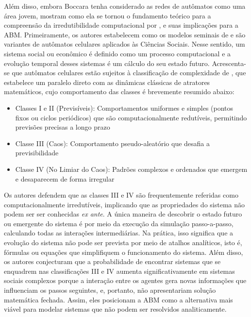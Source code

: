 \documentclass[12pt,oneside,a4paper,brazil,sumario=tradicional]{abntex2}
\begin{document}
Além disso, embora Boccara tenha considerado as redes de autômatos como uma área jovem,  mostram como ela se tornou o fundamento teórico para a compreensão da irredutibilidade computacional por , e suas implicações para a ABM. Primeiramente, os autores estabelecem como os modelos seminais de  e  são variantes de autômatos celulares aplicados às Ciências Sociais. Nesse sentido, um sistema social ou econômico é definido como um processo computacional e a evolução temporal desses sistemas é um cálculo do seu estado futuro. Acrescenta-se que autômatos celulares estão sujeitos à classificação de complexidade de , que estabelece um paralelo direto com as dinâmicas clássicas de atratores matemáticos, cujo comportamento das classes é brevemente resumido abaixo:

\begin{itemize}
  \item Classes I e II (Previsíveis): Comportamentos uniformes e simples (pontos fixos ou ciclos periódicos) que são computacionalmente redutíveis, permitindo previsões precisas a longo prazo
  \item Classe III (Caos): Comportamento pseudo-aleatório que desafia a previsibilidade
  \item Classe IV (No Limiar do Caos): Padrões complexos e ordenados que emergem e desaparecem de forma irregular
\end{itemize}
Os autores defendem que as classes III e IV são frequentemente referidas como computacionalmente irredutíveis, implicando que as propriedades do sistema não podem ser ser conhecidas \textit{ex ante}. A única maneira de descobrir o estado futuro ou emergente do sistema é por meio da execução da simulação passo-a-passo, calculando todas as interações intermediárias. Na prática, isso significa que a evolução do sistema não pode ser prevista por meio de atalhos analíticos, isto é, fórmulas ou equações que simplifiquem o funcionamento do sistema. Além disso, os autores conjecturam que a probabilidade de encontrar sistemas que se enquadrem nas classificações III e IV aumenta significativamente em sistemas sociais complexos porque a interação entre os agentes gera novas informações que influenciam os passos seguintes, e, portanto, não apresentariam solução matemática fechada. Assim, eles posicionam a ABM como a alternativa mais viável para modelar sistemas que não podem ser resolvidos analiticamente.
\end{document}

